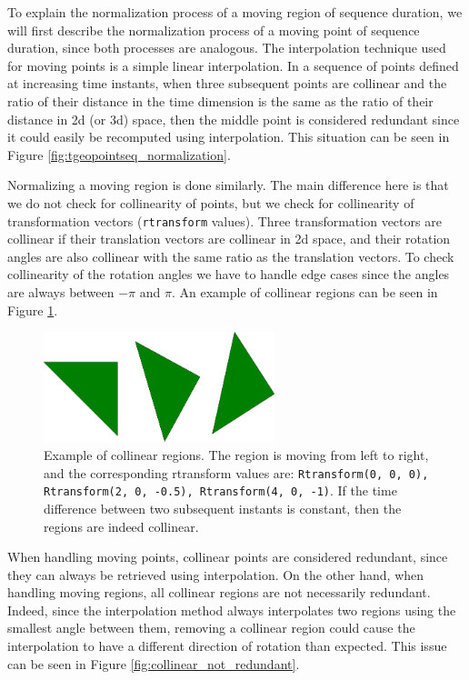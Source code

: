 To explain the normalization process of a moving region of sequence duration, we will first describe the normalization process of a moving point of sequence duration, since both processes are analogous. The interpolation technique used for moving points is a simple linear interpolation. In a sequence of points defined at increasing time instants, when three subsequent points are collinear and the ratio of their distance in the time dimension is the same as the ratio of their distance in 2d (or 3d) space, then the middle point is considered redundant since it could easily be recomputed using interpolation. This situation can be seen in Figure \ref{fig:tgeopointseq_normalization}.

Normalizing a moving region is done similarly. The main difference here is that we do not check for collinearity of points, but we check for collinearity of transformation vectors (\lstinline+rtransform+ values). Three transformation vectors are collinear if their translation vectors are collinear in 2d space, and their rotation angles are also collinear with the same ratio as the translation vectors. To check collinearity of the rotation angles we have to handle edge cases since the angles are always between $-\pi$ and $\pi$. An example of collinear regions can be seen in Figure \ref{fig:collinear_regions}.

\begin{figure}[h!]
    \centering
    \includegraphics[width=0.6\textwidth]{images/collinear_regions.pdf}
    \caption[Example of collinear regions]{Example of collinear regions. The region is moving from left to right, and the corresponding rtransform values are: \lstinline{Rtransform(0, 0, 0), Rtransform(2, 0, -0.5), Rtransform(4, 0, -1)}. If the time difference between two subsequent instants is constant, then the regions are indeed collinear.}
    \label{fig:collinear_regions}
\end{figure}

When handling moving points, collinear points are considered redundant, since they can always be retrieved using interpolation. On the other hand, when handling moving regions, all collinear regions are not necessarily redundant. Indeed, since the interpolation method always interpolates two regions using the smallest angle between them, removing a collinear region could cause the interpolation to have a different direction of rotation than expected. This issue can be seen in Figure \ref{fig:collinear_not_redundant}.

